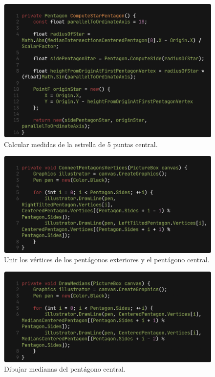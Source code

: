 \documentclass[oneside, a4paper]{article}
\begin{document}
            \begin{figure}[H]
                \centering
                \includegraphics[width=\textwidth]{compute_star_pentagon.png}
                \caption{Calcular medidas de la estrella de 5 puntas central.}
                \label{fig:compute_star_pentagon}
            \end{figure}

            \begin{figure}[H]
                \centering
                \includegraphics[width=\textwidth]{connect_pentagons_vertices.png}
                \caption{Unir los vértices de los pentágonos exteriores y el pentágono central.}
                \label{fig:connect_pentagons_vertices}
            \end{figure}

            \begin{figure}[H]
                \centering
                \includegraphics[width=\textwidth]{draw_medians.png}
                \caption{Dibujar medianas del pentágono central.}
                \label{fig:draw_medians}
            \end{figure}
\end{document}
